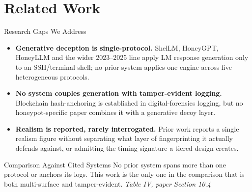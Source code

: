 \documentclass[aspectratio=169, 11pt]{beamer}
\newcommand{\srcnote}[1]{{\footnotesize\color{gray}\textit{#1}}}
\begin{document}
\section{Related Work}
\begin{frame}{Research Gaps We Address}
    \begin{itemize}
        \item \textbf{Generative deception is single-protocol.} ShelLM, HoneyGPT, HoneyLLM and the wider 2023--2025 line apply LM response generation only to an SSH/terminal shell; no prior system applies one engine across five heterogeneous protocols.
        \vspace{2mm}
        \item \textbf{No system couples generation with tamper-evident logging.} Blockchain hash-anchoring is established in digital-forensics logging, but no honeypot-specific paper combines it with a generative decoy layer.
        \vspace{2mm}
        \item \textbf{Realism is reported, rarely interrogated.} Prior work reports a single realism figure without separating what layer of fingerprinting it actually defends against, or admitting the timing signature a tiered design creates.
    \end{itemize}
\end{frame}

\begin{frame}{Comparison Against Cited Systems}
    \scriptsize
    \renewcommand{\arraystretch}{1.3}
    \vspace{3mm}
    \normalsize
    No prior system spans more than one protocol or anchors its logs. This work is the only one in the comparison that is both multi-surface and tamper-evident.
    \srcnote{Table IV, paper Section 10.4}
\end{frame}
\end{document}
